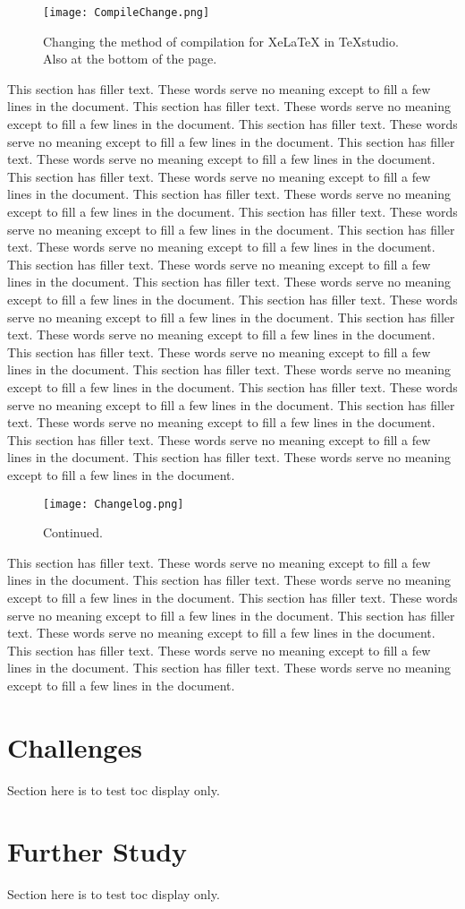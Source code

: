\begin{figure}[!b]
	\centering
	\texttt{[image: CompileChange.png]}
	\caption{Changing the method of compilation for XeLaTeX in TeXstudio. Also at the bottom of the page.}
	\label{fig:continued_fig}
\end{figure}

This section has filler text. These words serve no meaning except to fill a few lines in the document. This section has filler text. These words serve no meaning except to fill a few lines in the document. This section has filler text. These words serve no meaning except to fill a few lines in the document. This section has filler text. These words serve no meaning except to fill a few lines in the document. This section has filler text. These words serve no meaning except to fill a few lines in the document. This section has filler text. These words serve no meaning except to fill a few lines in the document. This section has filler text. These words serve no meaning except to fill a few lines in the document. This section has filler text. These words serve no meaning except to fill a few lines in the document. This section has filler text. These words serve no meaning except to fill a few lines in the document. This section has filler text. These words serve no meaning except to fill a few lines in the document. This section has filler text. These words serve no meaning except to fill a few lines in the document. This section has filler text. These words serve no meaning except to fill a few lines in the document. This section has filler text. These words serve no meaning except to fill a few lines in the document. This section has filler text. These words serve no meaning except to fill a few lines in the document. This section has filler text. These words serve no meaning except to fill a few lines in the document. This section has filler text. These words serve no meaning except to fill a few lines in the document. This section has filler text. These words serve no meaning except to fill a few lines in the document. This section has filler text. These words serve no meaning except to fill a few lines in the document.

\begin{figure}[ht]
	\ContinuedFloat
	\centering
	\texttt{[image: Changelog.png]}
	\caption[]{Continued.}
\end{figure}

This section has filler text. These words serve no meaning except to fill a few lines in the document. This section has filler text. These words serve no meaning except to fill a few lines in the document. This section has filler text. These words serve no meaning except to fill a few lines in the document. This section has filler text. These words serve no meaning except to fill a few lines in the document. This section has filler text. These words serve no meaning except to fill a few lines in the document. This section has filler text. These words serve no meaning except to fill a few lines in the document.

\section{Challenges}
Section here is to test toc display only.

\section{Further Study}
Section here is to test toc display only.
